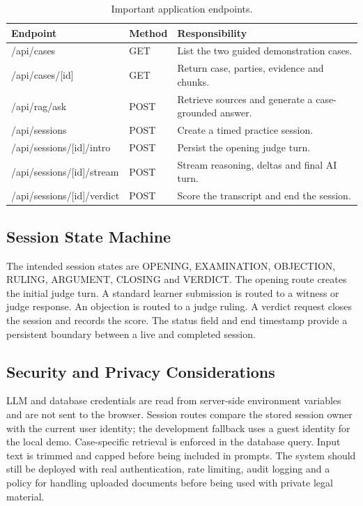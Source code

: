 \documentclass[12pt]{article}
\begin{document}
\begin{table}[!htbp]
\centering
\caption{Important application endpoints.}
\label{tab:endpoints}
\begin{tabularx}{0.95\textwidth}{p{}p{}X}
\toprule
Endpoint & Method & Responsibility \\
\midrule
/api/cases & GET & List the two guided demonstration cases. \\
/api/cases/[id] & GET & Return case, parties, evidence and chunks. \\
/api/rag/ask & POST & Retrieve sources and generate a case-grounded answer. \\
/api/sessions & POST & Create a timed practice session. \\
/api/sessions/[id]/intro & POST & Persist the opening judge turn. \\
/api/sessions/[id]/stream & POST & Stream reasoning, deltas and final AI turn. \\
/api/sessions/[id]/verdict & POST & Score the transcript and end the session. \\
\bottomrule
\end{tabularx}
\end{table}

\subsection{Session State Machine}
The intended session states are OPENING, EXAMINATION, OBJECTION, RULING, ARGUMENT, CLOSING and VERDICT. The opening route creates the initial judge turn. A standard learner submission is routed to a witness or judge response. An objection is routed to a judge ruling. A verdict request closes the session and records the score. The status field and end timestamp provide a persistent boundary between a live and completed session.

\subsection{Security and Privacy Considerations}
LLM and database credentials are read from server-side environment variables and are not sent to the browser. Session routes compare the stored session owner with the current user identity; the development fallback uses a guest identity for the local demo. Case-specific retrieval is enforced in the database query. Input text is trimmed and capped before being included in prompts. The system should still be deployed with real authentication, rate limiting, audit logging and a policy for handling uploaded documents before being used with private legal material.
\end{document}
